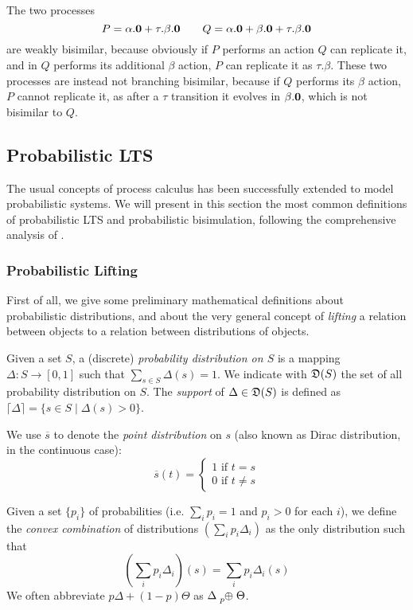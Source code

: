 The two processes \[P = \alpha.\mathbf{0} + \tau.\beta.\mathbf{0} \qquad Q = \alpha.\mathbf{0} + \beta.\mathbf{0} + \tau.\beta.\mathbf{0}\] are weakly bisimilar, because obviously if $P$ performs an action $Q$ can replicate it, and in $Q$ performs its additional $\beta$ action, $P$ can replicate it as $\tau.\beta$. These two processes are instead not branching bisimilar, because if $Q$ performs its $\beta$ action, $P$ cannot replicate it, as after a $\tau$ transition it evolves in $\beta.\mathbf{0}$, which is not bisimilar to $Q$.

\subsection{Probabilistic LTS} \label{pLTS}

The usual concepts of process calculus has been successfully extended to model probabilistic systems. We will present in this section the most common definitions of probabilistic LTS and probabilistic bisimulation, following the comprehensive analysis of \cite{hennessyExploringProbabilisticBisimulations2012, dengLogicalMetricAlgorithmic2011}.

\subsubsection{Probabilistic Lifting}
First of all, we give some preliminary mathematical definitions about probabilistic distributions, and about the very general concept of \textit{lifting} a relation between objects to a relation between distributions of objects.

Given a set $S$, a (discrete) \textit{probability distribution on $S$} is a mapping $\Delta: S \rightarrow [0, 1]$ such that $\sum_{s\in S} \Delta(s) = 1$. We indicate with $\mathfrak{D}(S)$ the set of all probability distribution on $S$.
The \textit{support} of $\Delta \in \mathfrak{D}(S)$ is defined as $\lceil\Delta\rceil = \{s \in S \mid \Delta(s) > 0\}$.

We use $\overline{s}$ to denote the \textit{point distribution} on $s$ (also known as Dirac distribution, in the continuous case):
\[
	\overline{s}(t) = 
	\begin{cases} 1 \text{ if }t = s \\
	0 \text{ if } t\neq s
	\end{cases}
\]

Given a set $\{p_i\}$ of probabilities (i.e. $\sum_i p_i = 1$ and $p_i > 0$ for each $i$), we define the \textit{convex combination} of distributions $\left(\sum_i p_i \Delta_i\right)$ as the only 
distribution such that
\[
\left(\sum_i p_i \Delta_i\right)(s) = \sum_i p_i \Delta_i(s)
\]
We often abbreviate $p \Delta + (1-p) \Theta$ as $\Delta \psum{p} \Theta$.

